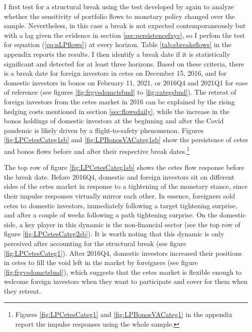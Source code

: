 \documentclass[a4paper, 12pt]{article}
\providecommand{\breakdatecetes}{December 15, 2016}
\providecommand{\breakdatebonos}{February 11, 2021}
\begin{document}
I first test for a structural break using the test developed by \textcite{BaiPerron:2003} again to analyze whether the sensitivity of portfolio flows to monetary policy changed over the sample. Nevertheless, in this case a break is not expected contemporaneously but with a lag given the evidence in section \ref{sec:persistencefxyc}, so I perfom the test for equation (\ref{eq:nLPflows}) at every horizon. Table \ref{tab:sbreaksflows} in the appendix reports the results. I then identify a break date if it is statistically significant and detected for at least three horizons. 
Based on these criteria, there is a break date for foreign investors in cetes on \breakdatecetes, and for domestic investors in bonos on \breakdatebonos, or 2016Q4 and 2021Q1 for ease of reference (see figures \ref{fig:frgvsdomctsbnd} to \ref{fig:categsbnd}). The retreat of foreign investors from the cetes market in 2016 can be explained by the rising hedging costs mentioned in section \ref{sec:flowsdaily}, while the increase in the bonos holdings of domestic investors at the beginning and after the Covid pandemic is likely driven by a flight-to-safety phenomenon.
Figures \ref{fig:LPCetesCateg1sb} and \ref{fig:LPBonosVACateg1sb} show the persistence of cetes and bonos flows before and after their respective break dates.\footnote{Figures \ref{fig:LPCetesCateg1} and \ref{fig:LPBonosVACateg1} in the appendix report the impulse responses using the whole sample.}

The top row of figure \ref{fig:LPCetesCateg1sb} shows the cetes flow response before the break date. 
Before 2016Q4, domestic and foreign investors sit on different sides of the cetes market in response to a tightening of the monetary stance, since their impulse responses virtually mirror each other. In essence, foreigners sold cetes to domestic investors, immediately following a target tightening surprise, and after a couple of weeks following a path tightening surprise. On the domestic side, a key player in this dynamic is the non-financial sector (see the top row of figure \ref{fig:LPCetesCateg2sb}). It is worth noting that this dynamic is only perceived after accounting for the structural break (see figure \ref{fig:LPCetesCateg1}). After 2016Q4, domestic investors increased their positions in cetes to fill the void left in the market by foreigners (see figure \ref{fig:frgvsdomctsbnd}), which suggests that the cetes market is flexible enough to welcome foreign investors when they want to participate and cover for them when they retreat. 
\end{document}
